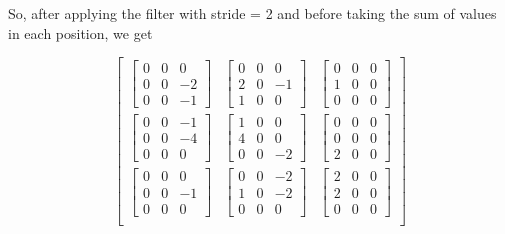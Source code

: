 \documentclass{article}
\begin{document}
So, after applying the filter with stride = 2 and before taking the sum of values in each position, we get

\[
  \begin{bmatrix}
    \begin{bmatrix} 0 & 0 & 0 \\ 0 & 0 & -2 \\ 0 & 0 & -1 \end{bmatrix} &
    \begin{bmatrix} 0 & 0 & 0 \\ 2 & 0 & -1 \\ 1 & 0 & 0 \end{bmatrix} &
    \begin{bmatrix} 0 & 0 & 0 \\ 1 & 0 & 0 \\ 0 & 0 & 0 \end{bmatrix}   \\

    \begin{bmatrix} 0 & 0 & -1 \\ 0 & 0 & -4 \\ 0 & 0 & 0 \end{bmatrix} &
    \begin{bmatrix} 1 & 0 & 0 \\ 4 & 0 & 0 \\ 0 & 0 & -2 \end{bmatrix} &
    \begin{bmatrix} 0 & 0 & 0 \\ 0 & 0 & 0 \\ 2 & 0 & 0 \end{bmatrix}   \\

    \begin{bmatrix} 0 & 0 & 0 \\ 0 & 0 & -1 \\ 0 & 0 & 0 \end{bmatrix} &
    \begin{bmatrix} 0 & 0 & -2 \\ 1 & 0 & -2 \\ 0 & 0 & 0 \end{bmatrix} &
    \begin{bmatrix} 2 & 0 & 0 \\ 2 & 0 & 0 \\ 0 & 0 & 0 \end{bmatrix}   \\
  \end{bmatrix}
\]
\end{document}
